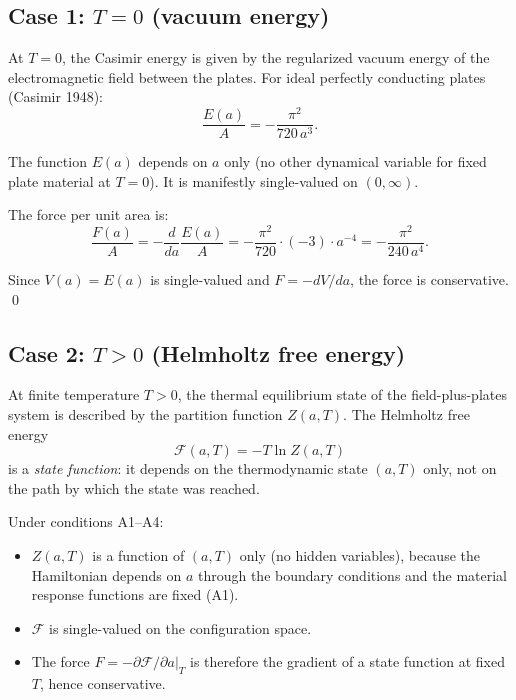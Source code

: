 \documentclass[11pt]{article}
\begin{document}
\subsection{Case 1: $T = 0$ (vacuum energy)}

At $T = 0$, the Casimir energy is given by the regularized vacuum energy
of the electromagnetic field between the plates.
For ideal perfectly conducting plates (Casimir 1948):
\begin{equation}
  \frac{E(a)}{A} = -\frac{\pi^2}{720\, a^3}.
  \label{eq:casimir-energy}
\end{equation}


The function $E(a)$ depends on $a$ only (no other dynamical variable
for fixed plate material at $T=0$).
It is manifestly single-valued on $(0,\infty)$.

The force per unit area is:
\begin{equation}
  \frac{F(a)}{A} = -\frac{d}{da}\frac{E(a)}{A}
  = -\frac{\pi^2}{720}\cdot(-3)\cdot a^{-4}
  = -\frac{\pi^2}{240\, a^4}.
  \label{eq:casimir-force}
\end{equation}

%

Since $V(a) = E(a)$ is single-valued and $F = -dV/da$, the force is
conservative. \qed

\subsection{Case 2: $T > 0$ (Helmholtz free energy)}

At finite temperature $T > 0$, the thermal equilibrium state of the
field-plus-plates system is described by the partition function $Z(a,T)$.
The Helmholtz free energy
\begin{equation}
  \mathcal{F}(a,T) = -T \ln Z(a,T)
  \label{eq:helmholtz}
\end{equation}
is a \emph{state function}: it depends on the thermodynamic state
$(a, T)$ only, not on the path by which the state was reached.

Under conditions A1--A4:
\begin{itemize}
  \item $Z(a,T)$ is a function of $(a,T)$ only (no hidden variables),
    because the Hamiltonian depends on $a$ through the boundary conditions
    and the material response functions are fixed (A1).
  \item $\mathcal{F}$ is single-valued on the configuration space.
  \item The force $F = -\partial \mathcal{F}/\partial a |_T$ is therefore
    the gradient of a state function at fixed $T$, hence conservative.
\end{itemize}
\end{document}
